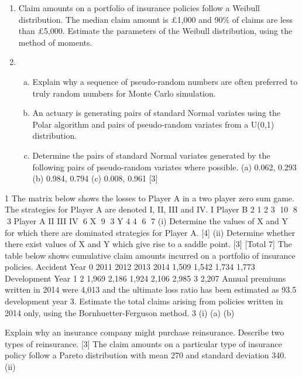 \documentclass[a4paper,12pt]{article}
\begin{document}
\begin{enumerate}
\item 
Claim amounts on a portfolio of insurance policies follow a Weibull distribution. The
median claim amount is £1,000 and 90\% of claims are less than £5,000.
Estimate the parameters of the Weibull distribution, using the method of moments. 

\item 

\begin{enumerate}[(a)]  
\item Explain why a sequence of pseudo-random numbers are often preferred to
truly random numbers for Monte Carlo simulation.

\item An actuary is generating pairs of standard Normal variates using the Polar algorithm
and pairs of pseudo-random variates from a U(0,1) distribution.
\item 
Determine the pairs of standard Normal variates generated by the following
pairs of pseudo-random variates where possible.
(a) 0.062, 0.293
(b) 0.984, 0.794
(c) 0.008, 0.961
[3]
\end{enumerate}
\end{enumerate}
\newpage

1
The matrix below shows the losses to Player A in a two player zero sum game. The
strategies for Player A are denoted I, II, III and IV.
I
Player B
2
1
2
3
10
8
3
Player A
II
III IV
6
X
9 3
Y
4
4
6
7
(i) Determine the values of X and Y for which there are dominated strategies for
Player A.
[4]
(ii) Determine whether there exist values of X and Y which give rise to a saddle
point.
[3]
[Total 7]
The table below shows cumulative claim amounts incurred on a portfolio of insurance
policies.
Accident Year
0
2011
2012
2013
2014
1,509
1,542
1,734
1,773
Development Year
1
2
1,969
2,186
1,924
2,106
2,985
3
2,207
Annual premiums written in 2014 were 4,013 and the ultimate loss ratio has been
estimated as 93.5%
development year 3.
Estimate the total claims arising from policies written in 2014 only, using the
Bornhuetter-Ferguson method.
3
(i)
(a)
(b)

Explain why an insurance company might purchase reinsurance.
Describe two types of reinsurance.
[3]
The claim amounts on a particular type of insurance policy follow a Pareto
distribution with mean 270 and standard deviation 340.
(ii)
\end{document}
